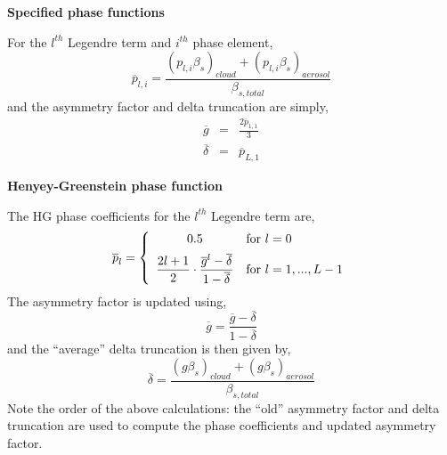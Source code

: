 \begin{minipage}[t]{3.25in}
  \begin{center}
    \textbf{Specified phase functions}
  \end{center}
  For the $l^{th}$ Legendre term and $i^{th}$ phase element,
  \begin{equation}
    \overline{p}_{l,i} = \frac{(p_{l,i}\beta_{s})_{cloud} + (p_{l,i}\beta_{s})_{aerosol}}{\beta_{s,total}}
  \end{equation}
  and the asymmetry factor and delta truncation are simply,
  \begin{eqnarray}
    \overline{g}      &=& \frac{2\overline{p}_{1,1}}{3}\\
    \overline{\delta} &=& \overline{p}_{L,1}\label{eqn:spf_deltatrunc}
  \end{eqnarray}
\end{minipage}\hfill\vline\hfill
\begin{minipage}[t]{3.25in}
  \begin{center}
    \textbf{Henyey-Greenstein phase function}
  \end{center}
  The HG phase coefficients for the $l^{th}$ Legendre term are,
  \begin{equation}
    \overline{p}_l = \left\{
    \begin{array}{cl}
    0.5 & \text{for } l=0\vspace{0.5em}\\
    \displaystyle\frac{2l+1}{2}\cdot\frac{\overline{g}^l-\overline{\delta}}{1-\overline{\delta}} & \text{for } l=1,...,L-1
    \end{array} \right.
  \end{equation}
  The asymmetry factor is updated using,
  \begin{equation}
    \overline{g} = \frac{\overline{g}-\overline{\delta}}{1-\overline{\delta}}{}{}
  \end{equation}
  and the ``average'' delta truncation is then given by,
  \begin{equation}
    \overline{\delta} = \frac{(g\beta_{s})_{cloud} + (g\beta_{s})_{aerosol}} {\beta_{s,total}}
    \label{eqn:hgpf_deltatrunc}
  \end{equation}
  Note the order of the above calculations: the ``old'' asymmetry factor and delta truncation are used to compute the phase coefficients and updated asymmetry factor.
\end{minipage}

